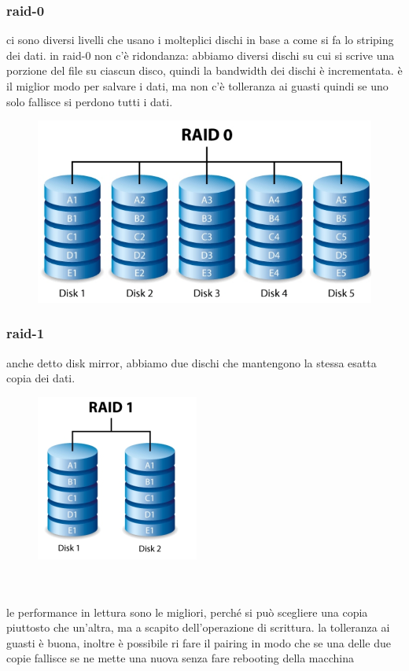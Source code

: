 \documentclass[12pt, oneside]{extbook} %
\begin{document}
\subsubsection{raid-0}
ci sono diversi livelli che usano i molteplici dischi in base a come si fa lo striping dei dati. in raid-0 non c'è ridondanza: abbiamo diversi dischi su cui si scrive una porzione del file su ciascun disco, quindi la bandwidth dei dischi è incrementata. è il miglior modo per salvare i dati, ma non c'è tolleranza ai guasti quindi se uno solo fallisce si perdono tutti i dati.\\
\begin{figure}[!h]
	\includegraphics[scale=0.4]{immagini/raid0.png}
\end{figure}
\subsubsection{raid-1}
anche detto disk mirror, abbiamo due dischi che mantengono la stessa esatta copia dei dati.\\
\begin{figure}[!h]
	\includegraphics[scale=0.4]{immagini/raid1.png}
\end{figure}\\\\
le performance in lettura sono le migliori, perché si può scegliere una copia piuttosto che un'altra, ma a scapito dell'operazione di scrittura. la tolleranza ai guasti è buona, inoltre è possibile ri fare il pairing in modo che se una delle due copie fallisce se ne mette una nuova senza fare rebooting della macchina
\end{document}
